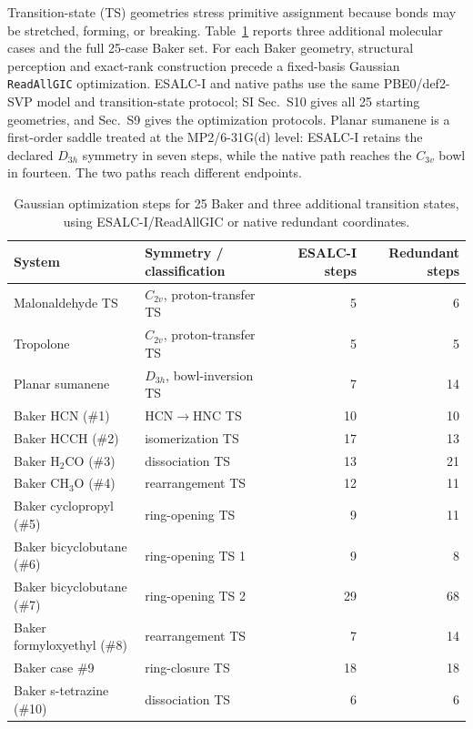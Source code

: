 \documentclass[journal=jctcce,manuscript=article,layout=traditional]{achemso}
\theoremstyle{definition}
\begin{document}
{Transition-state (TS) geometries stress primitive assignment
because bonds may be stretched, forming, or breaking.  Table~\ref{tab:transition-state-cases}
reports three additional molecular cases and the full 25-case Baker set.\cite{BakerChan1996TS}
For each Baker geometry, structural perception and exact-rank construction
precede a fixed-basis Gaussian \texttt{ReadAllGIC} optimization.  ESALC-I and
native paths use the same PBE0/def2-SVP model and transition-state protocol;
SI Sec.~S10 gives all 25 starting geometries, and Sec.~S9 gives the
optimization protocols.  Planar sumanene is a first-order saddle treated at
the MP2/6-31G(d) level: ESALC-I retains the declared \(D_{3h}\) symmetry in seven
steps, while the native path reaches the \(C_{3v}\) bowl in fourteen.
The two paths reach different endpoints.}

\begin{table}[htbp]
\centering
\scriptsize
\setlength{\tabcolsep}{4pt}
\caption{{Gaussian optimization steps for 25 Baker and three
additional transition states, using ESALC-I/ReadAllGIC or native redundant
coordinates.}}
\label{tab:transition-state-cases}
\begin{tabularx}{\linewidth}{@{}lXrr@{}}
\toprule
System & Symmetry / classification & ESALC-I steps & Redundant steps \\
\midrule
Malonaldehyde TS & \(C_{2v}\), proton-transfer TS & 5 & 6 \\
Tropolone & \(C_{2v}\), proton-transfer TS & 5 & 5 \\
{Planar sumanene} & \(D_{3h}\), bowl-inversion TS & 7 & 14 \\
Baker HCN (\#1) & HCN\(\rightarrow\)HNC TS & 10 & 10 \\
Baker HCCH (\#2) & isomerization TS & 17 & 13 \\
Baker H$_2$CO (\#3) & dissociation TS & 13 & 21 \\
Baker CH$_3$O (\#4) & rearrangement TS & 12 & 11 \\
Baker cyclopropyl (\#5) & ring-opening TS & 9 & 11 \\
Baker bicyclobutane (\#6) & ring-opening TS 1 & 9 & 8 \\
Baker bicyclobutane (\#7) & ring-opening TS 2 & 29 & 68 \\
Baker formyloxyethyl (\#8) & rearrangement TS & 7 & 14 \\
Baker case \#9 & ring-closure TS & 18 & 18 \\
Baker s-tetrazine (\#10) & dissociation TS & 6 & 6 \\

\end{tabularx}
\end{table}
\end{document}
